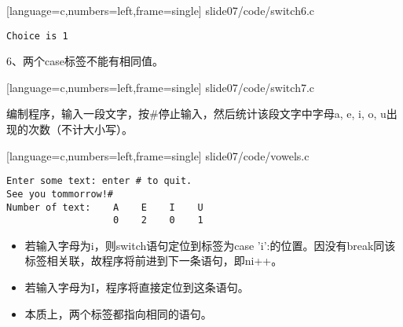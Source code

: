 \begin{frame}\ft{\secname}

[language=c,numbers=left,frame=single]
{slide07/code/switch6.c}
\begin{lstlisting}[backgroundcolor=\color{blue!20}]
Choice is 1
\end{lstlisting}
\end{frame}

\begin{frame}\ft{\secname}
6、两个case标签不能有相同值。
\end{frame}

\begin{frame}\ft{\secname}

[language=c,numbers=left,frame=single]
{slide07/code/switch7.c}
\end{frame}



\begin{frame}[fragile]\ft{\secname}
  \begin{li}
    编制程序，输入一段文字，按{\tf \#}停止输入，然后统计该段文字中字母a, e, i, o, u出现的次数（不计大小写）。
  \end{li}
\end{frame}



\begin{frame}\ft{\secname}

[language=c,numbers=left,frame=single]
{slide07/code/vowels.c}
\end{frame}

\begin{frame}[fragile]\ft{\secname}
\begin{lstlisting}[backgroundcolor=\color{red!10}]
Enter some text: enter # to quit.
See you tommorrow!#
Number of text:    A    E    I    U
                   0    2    0    1
\end{lstlisting}   
\end{frame}

\begin{frame}[fragile]\ft{\secname}
\begin{itemize}
\item
若输入字母为i，则switch语句定位到标签为case 'i':的位置。因没有break同该标签相关联，故程序将前进到下一条语句，即ni++。\\[0.1in]
\item 
若输入字母为I，程序将直接定位到这条语句。\\[0.1in]
\item 
本质上，两个标签都指向相同的语句。
\end{itemize} 
\end{frame}


